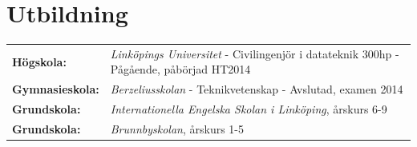\documentclass[a4paper,notitlepage]{article}
\begin{document}
\section*{Utbildning}
\noindent\begin{tabular}{@{}l p{11cm}}
	\textbf{Högskola:} & \textit{Linköpings Universitet} - Civilingenjör i
	datateknik 300hp - Pågående, påbörjad HT2014 \\

	\textbf{Gymnasieskola:} & \textit{Berzeliusskolan} - Teknikvetenskap -
	Avslutad, examen 2014 \\

	\textbf{Grundskola:} & \textit{Internationella Engelska Skolan i Linköping},
	årskurs 6-9 \\

	\textbf{Grundskola:} & \textit{Brunnbyskolan}, årskurs 1-5 \\
	\end{tabular}
\end{document}
